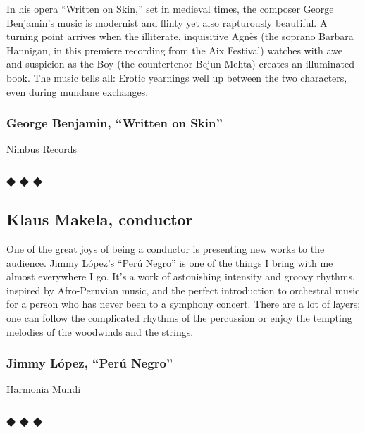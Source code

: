 In his opera ``Written on Skin,'' set in medieval times, the composer
George Benjamin's music is modernist and flinty yet also rapturously
beautiful. A turning point arrives when the illiterate, inquisitive
Agnès (the soprano Barbara Hannigan, in this premiere recording from the
Aix Festival) watches with awe and suspicion as the Boy (the
countertenor Bejun Mehta) creates an illuminated book. The music tells
all: Erotic yearnings well up between the two characters, even during
mundane exchanges.

\hypertarget{george-benjamin-written-on-skin}{%
\subsubsection{George Benjamin, ``Written on
Skin''}\label{george-benjamin-written-on-skin}}

Nimbus Records

\hypertarget{---14}{%
\subsubsection{◆ ◆ ◆}\label{---14}}

\hypertarget{klaus-makela-conductor}{%
\subsection{Klaus Makela, conductor}\label{klaus-makela-conductor}}

One of the great joys of being a conductor is presenting new works to
the audience. Jimmy López's ``Perú Negro'' is one of the things I bring
with me almost everywhere I go. It's a work of astonishing intensity and
groovy rhythms, inspired by Afro-Peruvian music, and the perfect
introduction to orchestral music for a person who has never been to a
symphony concert. There are a lot of layers; one can follow the
complicated rhythms of the percussion or enjoy the tempting melodies of
the woodwinds and the strings.

\hypertarget{jimmy-luxf3pez-peruxfa-negro}{%
\subsubsection{Jimmy López, ``Perú
Negro''}\label{jimmy-luxf3pez-peruxfa-negro}}

Harmonia Mundi

\hypertarget{---15}{%
\subsubsection{◆ ◆ ◆}\label{---15}}

